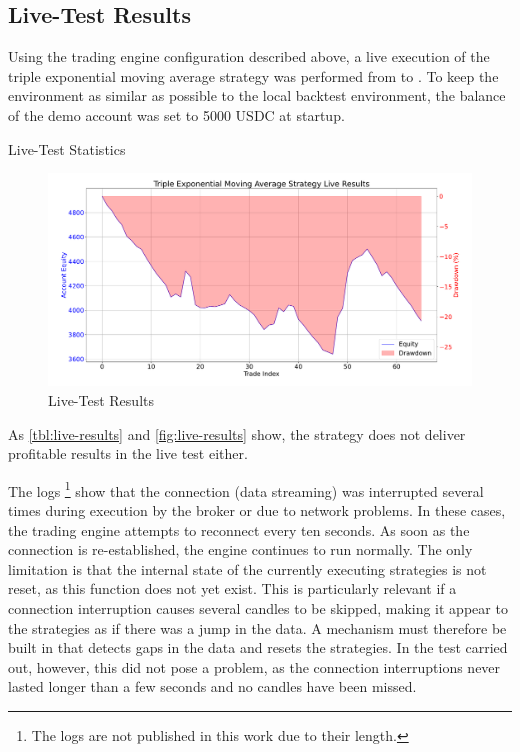 \subsection{Live-Test Results}

Using the trading engine configuration described above, a live execution of the triple exponential moving average strategy was performed from \liveStartDataStartDate to \liveStartDataEndDate.
To keep the environment as similar as possible to the local backtest environment, the balance of the demo account was set to 5000 USDC at startup.

\begin{table}
    \centering
    
    \caption{Live-Test Statistics}
    \label{tbl:live-results}
\end{table}

\begin{figure}[H]
    \centering
    \includegraphics[width=\textwidth]{images/live/live-result}
    \caption{Live-Test Results}
    \label{fig:live-results}
\end{figure}

\noindent
As \autoref{tbl:live-results} and \autoref{fig:live-results} show, the strategy does not deliver profitable results in the live test either.

The logs \footnote{The logs are not published in this work due to their length.} show that the connection (data streaming) was interrupted several times during execution by the broker or due to network problems.
In these cases, the trading engine attempts to reconnect every ten seconds.
As soon as the connection is re-established, the engine continues to run normally.
The only limitation is that the internal state of the currently executing strategies is not reset, as this function does not yet exist.
This is particularly relevant if a connection interruption causes several candles to be skipped, making it appear to the strategies as if there was a jump in the data.
A mechanism must therefore be built in that detects gaps in the data and resets the strategies.
In the test carried out, however, this did not pose a problem, as the connection interruptions never lasted longer than a few seconds and no candles have been missed.
